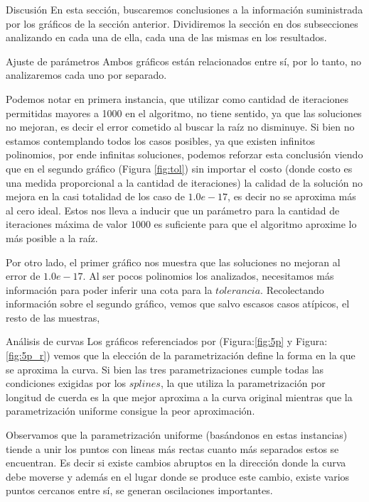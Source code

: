 \begin{section}{Discusión}
	En esta sección, buscaremos conclusiones a la información suministrada por los gráficos de la sección anterior. Dividiremos la sección en dos subsecciones analizando en cada una de ella, cada una de las mismas en los resultados.\\
	
\begin{subsection}{Ajuste de parámetros}
	Ambos gráficos están relacionados entre sí, por lo tanto, no analizaremos cada uno por separado. 
	
	Podemos notar en primera instancia, que utilizar como cantidad de iteraciones permitidas mayores a 1000 en el algoritmo, no tiene sentido, ya que las soluciones no mejoran, es decir el error cometido al buscar la raíz no disminuye. Si bien no estamos contemplando todos los casos posibles, ya que existen infinitos polinomios, por ende infinitas soluciones, podemos reforzar esta conclusión viendo que en el segundo gráfico (Figura \ref{fig:tol}) sin importar el costo (donde costo es una medida proporcional a la cantidad de iteraciones) la calidad de la solución no mejora en la casi totalidad de los caso de $1.0e-17$, es decir no se aproxima más al cero ideal.
	Estos nos lleva a inducir que un parámetro para la cantidad de iteraciones máxima de valor $1000$ es suficiente para que el algoritmo aproxime lo más posible a la raíz.
	
	Por otro lado, el primer gráfico nos muestra que las soluciones no mejoran al error de $1.0e-17$. Al ser pocos polinomios los analizados, necesitamos más información para poder inferir una cota para la $tolerancia$. Recolectando información sobre el segundo gráfico, vemos que salvo escasos casos atípicos, el resto de las muestras,
	
\end{subsection}
\begin{subsection}{Análisis de curvas}
	Los gráficos referenciados por (Figura:\ref{fig:5p} y Figura:\ref{fig:5p_r}) vemos que la elección de la parametrización define la forma en la que se aproxima la curva. Si bien las tres parametrizaciones cumple todas las condiciones exigidas por los $splines$, la que utiliza la parametrización por longitud de cuerda es la que mejor aproxima a la curva original mientras que la parametrización uniforme consigue la peor aproximación.
	
	Observamos que la parametrización uniforme (basándonos en estas instancias) tiende a unir los puntos con lineas más rectas cuanto más separados estos se encuentran. Es decir si existe cambios abruptos en la dirección donde la curva debe moverse y además en el lugar donde se produce este cambio, existe varios puntos cercanos entre sí, se generan oscilaciones importantes.  
	

\end{subsection}
\end{section}
